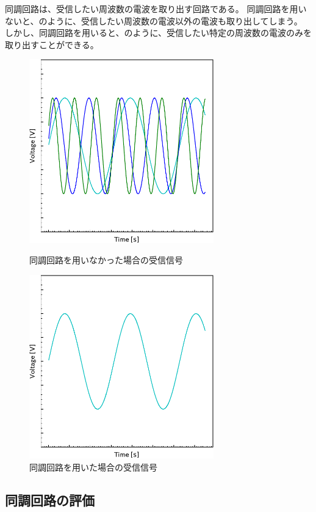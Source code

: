 \documentclass[report.tex]{subfiles}
\begin{document}
同調回路は、受信したい周波数の電波を取り出す回路である。
同調回路を用いないと、のように、受信したい周波数の電波以外の電波も取り出してしまう。
しかし、同調回路を用いると、のように、受信したい特定の周波数の電波のみを取り出すことができる。

\begin{figure}[H]
	\begin{minipage}[b]{0.5\linewidth}
		\centering
		\includegraphics[width=8cm]{fig/diff.pdf}
		\caption{同調回路を用いなかった場合の受信信号}
		\label{fig:notuse}
	\end{minipage}
	\begin{minipage}[b]{0.5\linewidth}
		\centering
		\includegraphics[width=8cm]{fig/diff2.pdf}
		\caption{同調回路を用いた場合の受信信号}
		\label{fig:use}
	\end{minipage}
\end{figure}

\subsection{同調回路の評価}
\end{document}
